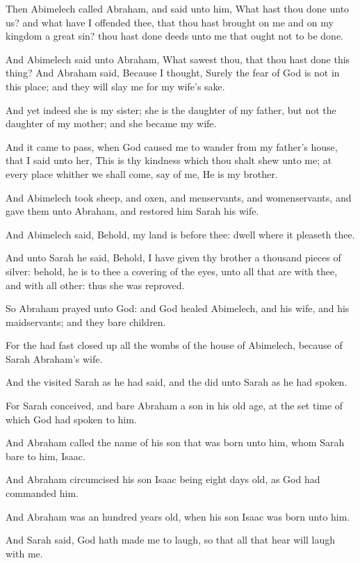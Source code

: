 \Verse Then Abimelech called Abraham, and said unto him, What hast thou done unto us? and what have I offended thee, that thou hast brought on me and on my kingdom a great sin? thou hast done deeds unto me that ought not to be done.

\Verse And Abimelech said unto Abraham, What sawest thou, that thou hast done this thing?  \Verse And Abraham said, Because I thought, Surely the fear of God is not in this place; and they will slay me for my wife's sake.

\Verse And yet indeed she is my sister; she is the daughter of my father, but not the daughter of my mother; and she became my wife.

\Verse And it came to pass, when God caused me to wander from my father's house, that I said unto her, This is thy kindness which thou shalt shew unto me; at every place whither we shall come, say of me, He is my brother.

\Verse And Abimelech took sheep, and oxen, and menservants, and womenservants, and gave them unto Abraham, and restored him Sarah his wife.

\Verse And Abimelech said, Behold, my land is before thee: dwell where it pleaseth thee.

\Verse And unto Sarah he said, Behold, I have given thy brother a thousand pieces of silver: behold, he is to thee a covering of the eyes, unto all that are with thee, and with all other: thus she was reproved.

\Verse So Abraham prayed unto God: and God healed Abimelech, and his wife, and his maidservants; and they bare children.

\Verse For the \LORD had fast closed up all the wombs of the house of Abimelech, because of Sarah Abraham's wife.

\Chapter
\Verse And the \LORD visited Sarah as he had said, and the \LORD did unto Sarah as he had spoken.

\Verse For Sarah conceived, and bare Abraham a son in his old age, at the set time of which God had spoken to him.

\Verse And Abraham called the name of his son that was born unto him, whom Sarah bare to him, Isaac.

\Verse And Abraham circumcised his son Isaac being eight days old, as God had commanded him.

\Verse And Abraham was an hundred years old, when his son Isaac was born unto him.

\Verse And Sarah said, God hath made me to laugh, so that all that hear will laugh with me.

